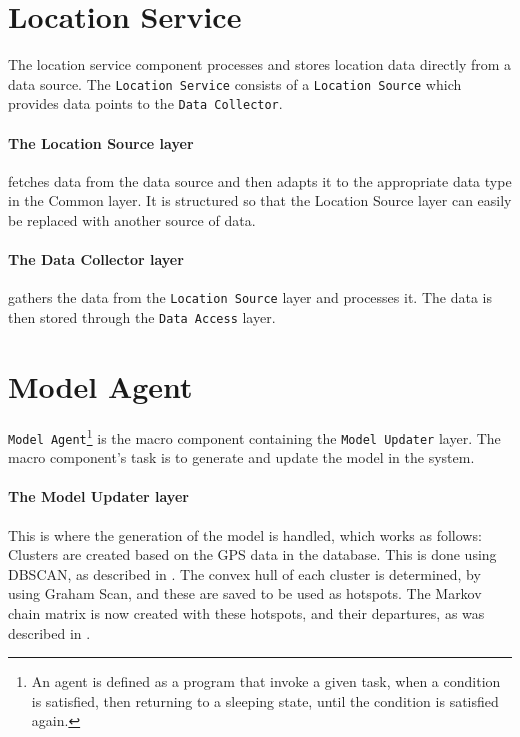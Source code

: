 \section{Location Service} 
The location service component processes and stores location data directly from a data source. 
The \texttt{Location Service} consists of a \texttt{Location Source} which provides data points to the \texttt{Data Collector}.

\paragraph{The Location Source layer} fetches data from the data source and then adapts it to the appropriate data type in the Common layer.
It is structured so that the Location Source layer can easily be replaced with another source of data.

\paragraph{The Data Collector layer} gathers the data from the \texttt{Location Source} layer and processes it. 
The data is then stored through the \texttt{Data Access} layer.

\section{Model Agent}
\texttt{Model Agent}\footnote{An agent is defined as a program that invoke a given task, when a condition is satisfied, then returning to a sleeping state, until the condition is satisfied again.\cite{definitionagent}} is the macro component containing the \texttt{Model Updater} layer.
The macro component's task is to generate and update the model in the system. 

\paragraph{The Model Updater layer} This is where the generation of the model is handled, which works as follows:\\
Clusters are created based on the GPS data in the database.
This is done using DBSCAN, as described in .
The convex hull of each cluster is determined, by using Graham Scan, and these are saved to be used as hotspots.
The Markov chain matrix is now created with these hotspots, and their departures, as was described in .

